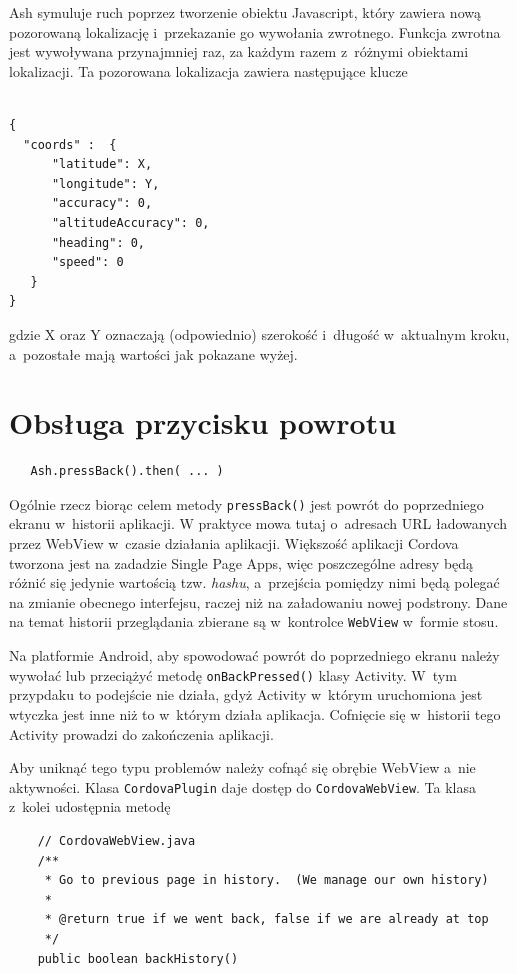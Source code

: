 \documentclass[brudnopis]{xmgr}
\begin{document}
Ash symuluje ruch poprzez tworzenie obiektu Javascript, który zawiera nową pozorowaną lokalizację i~przekazanie go wywołania zwrotnego. Funkcja zwrotna jest wywoływana przynajmniej raz, za każdym razem z~różnymi obiektami lokalizacji. Ta pozorowana lokalizacja zawiera następujące klucze

\begin{lstlisting}

{
  "coords" :  {
      "latitude": X, 
      "longitude": Y,
      "accuracy": 0, 
      "altitudeAccuracy": 0, 
      "heading": 0, 
      "speed": 0
   }
}

\end{lstlisting}

gdzie X oraz Y oznaczają (odpowiednio) szerokość i~długość w~aktualnym kroku, a~pozostałe mają wartości jak pokazane wyżej.   

\section{Obsługa przycisku powrotu}

\begin{lstlisting}
   Ash.pressBack().then( ... ) 
\end{lstlisting}

Ogólnie rzecz biorąc celem metody \texttt{pressBack()} jest powrót do poprzedniego ekranu w~historii aplikacji. W praktyce mowa tutaj o~adresach URL ładowanych przez WebView w~czasie działania aplikacji. Większość aplikacji Cordova tworzona jest na zadadzie Single Page Apps, więc poszczególne adresy będą różnić się jedynie wartością tzw. \textit{hashu}, a~przejścia pomiędzy nimi będą polegać na zmianie obecnego interfejsu, raczej niż na załadowaniu nowej podstrony. Dane na temat historii przeglądania zbierane są w~kontrolce \texttt{WebView} w~formie stosu.

Na platformie Android, aby spowodować powrót do poprzedniego ekranu należy wywołać lub przeciążyć metodę \texttt{onBackPressed()} klasy Activity. W~tym przypdaku to podejście nie działa, gdyż Activity w~którym uruchomiona jest wtyczka jest inne niż to w~którym działa aplikacja. Cofnięcie się w~historii tego Activity prowadzi do zakończenia aplikacji. 

Aby uniknąć tego typu problemów należy cofnąć się obrębie WebView a~nie aktywności. Klasa \texttt{CordovaPlugin} daje dostęp do \texttt{CordovaWebView}. Ta klasa z~kolei udostępnia metodę 

\begin{lstlisting}
    // CordovaWebView.java
    /**
     * Go to previous page in history.  (We manage our own history)
     *
     * @return true if we went back, false if we are already at top
     */
    public boolean backHistory()
\end{lstlisting}
\end{document}

